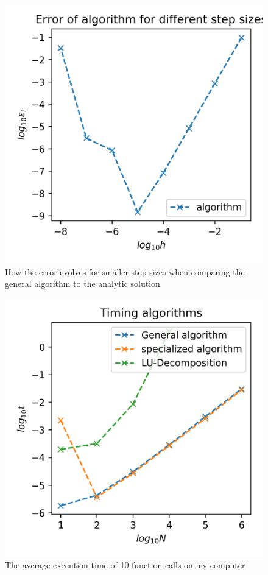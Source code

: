 \documentclass[10pt,showpacs,preprintnumbers,footinbib,amsmath,amssymb,aps,prl,twocolumn,groupedaddress,superscriptaddress,showkeys]{revtex4-1}
\begin{document}
  \begin{figure}[h!]
    \center
    \includegraphics[scale=.7]{figs/ex1e_err.png}
    \caption{How the error evolves for smaller step sizes when comparing the general algorithm to the analytic solution}
    \label{fig:error}
  \end{figure}

  \begin{figure}[h!]
    \center
    \includegraphics[scale=.7]{figs/ex1d_time.png}
    \caption{The average execution time of 10 function calls on my computer}
    \label{fig:time}
  \end{figure}
\end{document}
